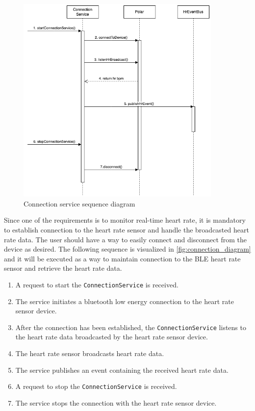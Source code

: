 \begin{figure}[H]
    \centering
    \includegraphics[width=0.9\textwidth]{diagrams/connection-service-onStart.drawio.png}
    \caption{Connection service sequence diagram}
    \label{fig:connection_diagram}
\end{figure}
Since one of the requirements is to monitor real-time heart rate, it is mandatory to establish connection to the heart rate sensor and handle the broadcasted heart rate data. The user should have a way to easily connect and disconnect from the device as desired.
The following sequence is visualized in \autoref{fig:connection_diagram} and it will be executed as a way to maintain connection to the BLE heart rate sensor and retrieve the heart rate data.
\begin{enumerate}
    \item A request to start the \texttt{ConnectionService} is received.
    \item The service initiates a bluetooth low energy connection to the heart rate sensor device.
    \item After the connection has been established, the \texttt{ConnectionService} listens to the heart rate data broadcasted by the heart rate sensor device.
    \item The heart rate sensor broadcasts heart rate data.
    \item The service publishes an event containing the received heart rate data.
    \item A request to stop the \texttt{ConnectionService} is received.
    \item The service stops the connection with the heart rate sensor device.
\end{enumerate}

